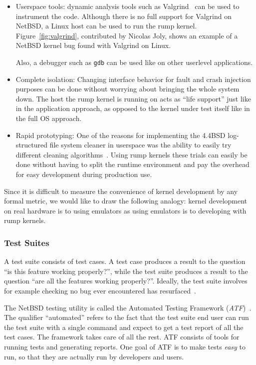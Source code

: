 \begin{itemize}
\item   Userspace tools: dynamic analysis tools such as
	Valgrind~\cite{nethercote:valgrind} can be used to instrument
	the code.  Although there is no full support for
	Valgrind on NetBSD, a Linux host can be used to run
	the rump kernel.
	Figure~\ref{fig:valgrind}, contributed by Nicolas Joly, shows an
	example of a NetBSD kernel bug found with Valgrind on Linux.

	Also, a debugger such as \texttt{gdb} can be used like
	on other userlevel applications.

\item   Complete isolation: Changing interface behavior for
	\eg fault and crash injection~\cite{hsueh:fault,prabhakaran:iron}
	purposes can be done without worrying about bringing the whole
	system down.  The host the rump kernel is running on acts as ``life
	support'' just like in the application approach, as opposed to the
	kernel under test itself like in the full OS approach.

\item   Rapid prototyping: One of the reasons for implementing
	the 4.4BSD log-structured file system cleaner in userspace
	was the ability to easily try different cleaning
	algorithms~\cite{seltzer:lfs}.  Using rump kernels these trials
	can easily be done without having to split the runtime
	environment and pay the overhead for easy development during
	production use.
\end{itemize}

Since it is difficult to measure the convenience of kernel
development by any formal metric, we would like to draw the following
analogy: kernel development on real hardware is to using emulators
as using emulators is to developing with rump kernels.

\subsubsection{Test Suites}

A test suite consists of test cases.  A test case produces a
result to the question ``is this feature working properly?'', while
the test suite produces a result to the question ``are all the
features working properly?''.  Ideally, the test suite involves
for example checking no bug ever encountered has
resurfaced~\cite{bwk:codetesting}.

The NetBSD testing utility is called the Automated Testing Framework
(\textit{ATF})~\cite{jmmv:atf}.  The qualifier ``automated'' refers
to the fact that the test suite end user can run the test suite
with a single command and expect to get a test report of all the
test cases.  The framework takes care of all the rest.  ATF consists
of tools for running tests and generating reports.  One goal of
ATF is to make tests \textit{easy} to run, so that they are actually
run by developers and users.

